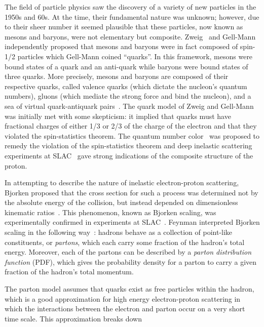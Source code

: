 The field of particle physics saw the discovery of a variety of new particles in the 1950s and 60s.
At the time, their fundamental nature was unknown; however, due to their sheer number it seemed plausible that these particles, now known as mesons and baryons, were not elementary but composite.
Zweig~\cite{Zweig:1964jf} and Gell-Mann~\cite{GellMann:1964nj} independently proposed that mesons and baryons were in fact composed of spin-1/2 particles which Gell-Mann coined ``quarks''.
In this framework, mesons were bound states of a quark and an anti-quark while baryons were bound states of three quarks. More precisely, mesons and baryons are composed of their respective quarks, called valence quarks (which dictate the nucleon's quantum numbers), gluons (which mediate the strong force and bind the nucleon), and a sea of virtual quark-antiquark pairs~\cite{Yan:2015zoa}. 
The quark model of Zweig and Gell-Mann was initially met with some skepticism: it implied that quarks must have fractional charges of either 1/3 or 2/3 of the charge of the electron and that they violated the spin-statistics theorem.
The quantum number color~\cite{Greenberg:1964pe} was proposed to remedy the violation of the spin-statistics theorem and deep inelastic scattering experiments at SLAC~\cite{Breidenbach:1969kd,Bloom:1969kc} gave strong indications of the composite structure of the proton.

In attempting to describe the nature of inelastic electron-proton scattering, Bjorken proposed that the cross section for such a process was determined not by the absolute energy of the collision, but instead depended on dimensionless kinematic ratios~\cite{Bjorken:1969ja}.
This phenomenon, known as Bjorken scaling, was experimentally confirmed in experiments at SLAC~\cite{Prentki:1968fha}. 
Feynman interpreted Bjorken scaling in the following way~\cite{Feynman:1969ej}: hadrons behave as a collection of point-like constituents, or \emph{partons}, which each carry some fraction of the hadron's total energy.
Moreover, each of the partons can be described by a \emph{parton distribution function} (PDF), which gives the probability density for a parton to carry a given fraction of the hadron's total momentum.

The parton model assumes that quarks exist as free particles within the hadron, which is a good approximation for high energy electron-proton scattering in which the interactions between the electron and parton occur on a very short time scale.
This approximation breaks down
